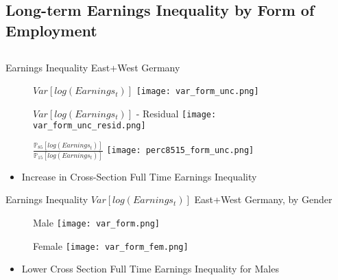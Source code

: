\documentclass[hyperref={bookmarks=false}]{beamer}
\begin{document}
\begin{appendix}
\section{Long-term Earnings Inequality by Form of Employment}
\subsection{}

\begin{frame}
\label{LTEIF}
\end{frame}


\begin{frame}{Earnings Inequality}
East+West Germany
\begin{figure}[!t]
\begin{minipage}[b]{0.32\textwidth}{$Var[log(Earnings_t)]$}
\centering
\texttt{[image: var\_form\_unc.png]}
\end{minipage}
\begin{minipage}[b]{0.32\textwidth}{$Var[log(Earnings_t)]$ - Residual}
\centering
\texttt{[image: var\_form\_unc\_resid.png]}
\end{minipage}
\begin{minipage}[b]{0.32\textwidth}{$\frac{\mathbb{P}_{85}[log(Earnings_t)]}{\mathbb{P}_{15}[log(Earnings_t)]}$}
\centering
\texttt{[image: perc8515\_form\_unc.png]}
\end{minipage}
\end{figure}
\begin{itemize}
\item Increase in Cross-Section Full Time Earnings Inequality
\end{itemize}
\end{frame}

\begin{frame}{Earnings Inequality}
$Var[log(Earnings_t)]$ East+West Germany, by Gender
\begin{figure}[!t]
\begin{minipage}[b]{0.32\textwidth}{Male}
\centering
\texttt{[image: var\_form.png]}
\end{minipage}
\begin{minipage}[b]{0.32\textwidth}{Female}
\centering
\texttt{[image: var\_form\_fem.png]}
\end{minipage}
\end{figure}
\begin{itemize}
\item Lower Cross Section Full Time Earnings Inequality for Males
\end{itemize}
\end{frame}


\end{appendix}
\end{document}
